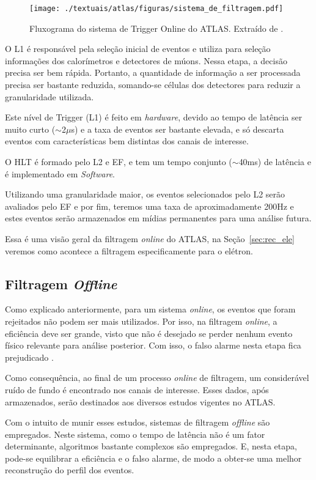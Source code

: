 \begin{figure}[h!]
	\centering
	\texttt{[image: ./textuais/atlas/figuras/sistema\_de\_filtragem.pdf]}\\
	\caption{Fluxograma do sistema de Trigger Online do ATLAS. Extraído de \cite{dos2006sistema}.}
	\label{fig:3T15}
\end{figure}

O L1 é responsável pela seleção inicial de eventos e utiliza para seleção informações dos calorímetros e detectores de múons. Nessa etapa, a decisão precisa ser bem rápida. Portanto, a quantidade de informação a ser processada precisa ser bastante reduzida, somando-se células dos detectores para reduzir a granularidade utilizada.

Este nível de Trigger (L1) é feito em \emph{hardware}, devido ao tempo de latência ser muito curto ($\sim$2$\mu$s) e a taxa de eventos ser bastante elevada, e só descarta eventos com características bem distintas dos canais de interesse.

O HLT é formado pelo L2 e EF, e tem um tempo conjunto ($\sim$40ms) de latência e é implementado em \emph{Software}.

Utilizando uma granularidade maior, os eventos selecionados pelo L2 serão avaliados pelo EF e por fim, teremos uma taxa de aproximadamente 200Hz e estes eventos serão armazenados em mídias permanentes para uma análise futura.

Essa é uma visão geral da filtragem \emph{online} do ATLAS, na Seção~\ref{sec:rec_ele} veremos como acontece a filtragem especificamente para o elétron.


\subsection{Filtragem \emph{Offline}}

Como explicado anteriormente, para um sistema \emph{online}, os eventos que foram rejeitados não podem ser mais utilizados. Por isso, na filtragem \emph{online}, a eficiência deve ser grande, visto que não é desejado se perder nenhum evento físico relevante para análise posterior. Com isso, o falso alarme nesta etapa fica prejudicado \cite{torres2010sistema} .

Como consequência, ao final de um processo \emph{online} de filtragem, um considerável ruído de fundo é encontrado nos canais de interesse. Esses dados, após armazenados, serão destinados aos diversos estudos vigentes no ATLAS.

Com o intuito de munir esses estudos, sistemas de filtragem \emph{offline} são empregados. Neste sistema, como o tempo de latência não é um fator determinante, algoritmos bastante complexos são empregados. E, nesta etapa, pode-se equilibrar a eficiência e o falso alarme, de modo a obter-se uma melhor reconstrução do perfil dos eventos.

